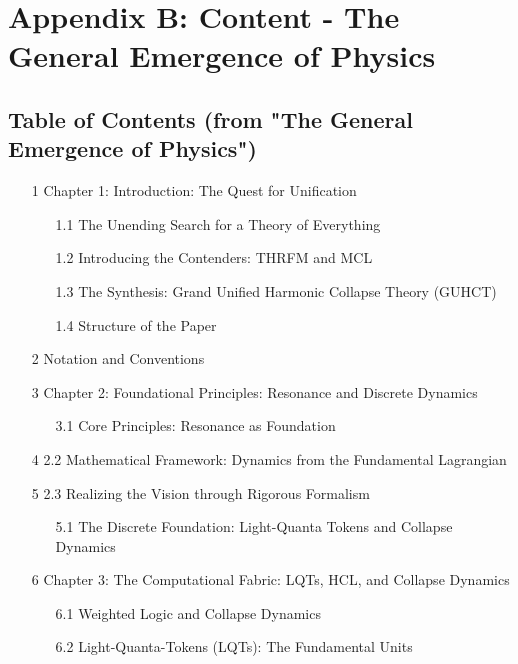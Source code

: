\documentclass[11pt,a4paper]{article}
\begin{document}
\section{Appendix B: Content - The General Emergence of Physics}
\label{app:general_emergence_physics_toc}
\subsection*{Table of Contents (from "The General Emergence of Physics")}
\begin{itemize}
    \item[1] Chapter 1: Introduction: The Quest for Unification 
    \begin{itemize}
        \item[1.1] The Unending Search for a Theory of Everything 
        \item[1.2] Introducing the Contenders: THRFM and MCL 
        \item[1.3] The Synthesis: Grand Unified Harmonic Collapse Theory (GUHCT) 
        \item[1.4] Structure of the Paper 
    \end{itemize}
    \item[2] Notation and Conventions 
    \item[3] Chapter 2: Foundational Principles: Resonance and Discrete Dynamics 
    \begin{itemize}
        \item[3.1] Core Principles: Resonance as Foundation 
    \end{itemize}
    \item[4] 2.2 Mathematical Framework: Dynamics from the Fundamental Lagrangian 
    \item[5] 2.3 Realizing the Vision through Rigorous Formalism 
    \begin{itemize}
        \item[5.1] The Discrete Foundation: Light-Quanta Tokens and Collapse Dynamics 
    \end{itemize}
    \item[6] Chapter 3: The Computational Fabric: LQTs, HCL, and Collapse Dynamics 
    \begin{itemize}
        \item[6.1] Weighted Logic and Collapse Dynamics 
        \item[6.2] Light-Quanta-Tokens (LQTs): The Fundamental Units 

\end{itemize}
\end{itemize}
\end{document}
